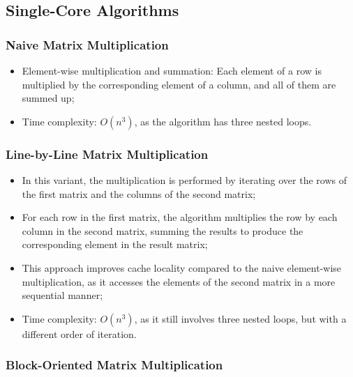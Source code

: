 \documentclass{article}
\begin{document}
\subsection{Single-Core Algorithms}

\subsubsection{Naive Matrix Multiplication}

\begin{itemize}
\item Element-wise multiplication and summation: Each element of a row is multiplied by the corresponding element of a column, and all of them are summed up;
\item Time complexity: $O(n^3)$, as the algorithm has three nested loops.
\end{itemize}

\subsubsection{Line-by-Line Matrix Multiplication}

\begin{itemize}
\item In this variant, the multiplication is performed by iterating over the rows of the first matrix and the columns of the second matrix;
\item For each row in the first matrix, the algorithm multiplies the row by each column in the second matrix, summing the results to produce the corresponding element in the result matrix;
\item This approach improves cache locality compared to the naive element-wise multiplication, as it accesses the elements of the second matrix in a more sequential manner;
\item Time complexity: $O(n^3)$, as it still involves three nested loops, but with a different order of iteration.
\end{itemize}

\subsubsection{Block-Oriented Matrix Multiplication}
\end{document}
